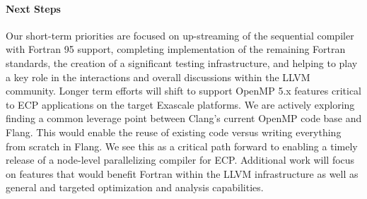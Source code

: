 \paragraph{Next Steps}
Our short-term priorities are focused on up-streaming of the
sequential compiler with Fortran 95 support, completing implementation of the remaining Fortran standards,
the creation of a significant testing infrastructure, and helping to play a key role in
the interactions and overall discussions within the LLVM community.  Longer term efforts
will shift to support OpenMP 5.x features critical to ECP applications
on the target Exascale platforms.  We are actively exploring finding a
common leverage point between Clang's current OpenMP code base and
Flang.  This would enable the reuse of existing code versus writing
everything from scratch in Flang.  We see this as a critical path
forward to enabling a timely release of a node-level parallelizing
compiler for ECP.  Additional work will focus on features that would
benefit Fortran within the LLVM infrastructure as well as general and
targeted optimization and analysis capabilities.

